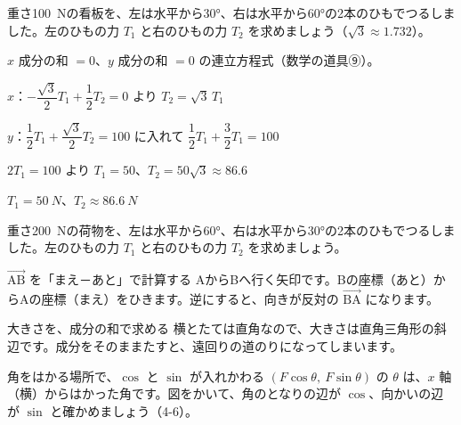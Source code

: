 \begin{reidai}[2本のひもでつるした物のつり合い]
重さ\qty{100}{N}の看板を、左は水平から30°、右は水平から60°の2本のひもでつるしました。左のひもの力 $T_1$ と右のひもの力 $T_2$ を求めましょう（$\sqrt3\approx1.732$）。\par
\kangaekata $x$ 成分の和 $=0$、$y$ 成分の和 $=0$ の連立方程式（数学の道具⑨）。\par
\shiki $x$：$-\dfrac{\sqrt3}{2}T_1+\dfrac{1}{2}T_2=0$ より $T_2=\sqrt3\,T_1$\par
\hspace*{2.6\zw}$y$：$\dfrac{1}{2}T_1+\dfrac{\sqrt3}{2}T_2=100$ に入れて $\dfrac{1}{2}T_1+\dfrac{3}{2}T_1=100$\par
\hspace*{2.6\zw}$2T_1=100$ より $T_1=50$、$T_2=50\sqrt3\approx86.6$\par
\kotae $T_1=\qty{50}{N}$、$T_2\approx\qty{86.6}{N}$
\end{reidai}

\begin{jibun}
重さ\qty{200}{N}の荷物を、左は水平から60°、右は水平から30°の2本のひもでつるしました。左のひもの力 $T_1$ と右のひもの力 $T_2$ を求めましょう。
\end{jibun}


\begin{tsumazuki}{$\overrightarrow{\mathrm{AB}}$ を「まえ－あと」で計算する}
AからBへ行く矢印です。Bの座標（あと）からAの座標（まえ）をひきます。逆にすると、向きが反対の $\overrightarrow{\mathrm{BA}}$ になります。
\end{tsumazuki}

\begin{tsumazuki}{大きさを、成分の和で求める}
横とたては直角なので、大きさは直角三角形の斜辺です。成分をそのままたすと、遠回りの道のりになってしまいます。
\end{tsumazuki}

\begin{tsumazuki}{角をはかる場所で、$\cos$ と $\sin$ が入れかわる}
$(F\cos\theta,\ F\sin\theta)$ の $\theta$ は、$x$ 軸（横）からはかった角です。図をかいて、角のとなりの辺が $\cos$、向かいの辺が $\sin$ と確かめましょう（4-6）。
\end{tsumazuki}


